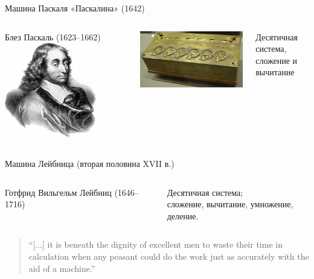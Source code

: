 \begin{frame}{Машина Паскаля «Паскалина» (1642)}
    \begin{columns}
    \column{4cm}
        \begin{block}{Блез Паскаль (1623–1662)}
        \includegraphics[width=4cm,keepaspectratio]{./images/pascal.jpg}
        \end{block}
    \column{7cm} \includegraphics[width=7cm,keepaspectratio]{./images/pascaline.jpg}

    Десятичная система,\\сложение и вычитание
    \end{columns}
\end{frame}

\begin{frame}{Машина Лейбница (вторая половина XVII в.)}
    \begin{columns}
    \column{4cm}
        \begin{block}{\small Готфрид Вильгельм Лейбниц (1646–1716)}
        \begin{center}
        \end{center}
        \end{block}

    \column{7cm}
    \begin{center}
    \end{center}

    \small Десятичная система;\\
        сложение, вычитание, умножение, деление.
    \end{columns}
\begin{quote}
    \small “[...] it is beneath the dignity of excellent men to waste their time in calculation when any peasant could do the work just as accurately with the aid of a machine.”
\end{quote}
\end{frame}

